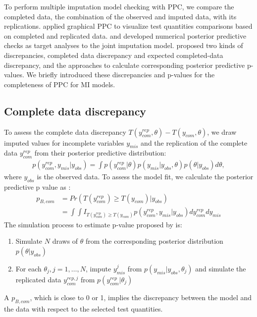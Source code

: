 	To perform multiple imputation model checking with PPC, we compare the completed data, the combination of the observed and imputed data, with its replications. \citet{gelman2005multiple} applied graphical PPC to visualize test quantities comparisons based on completed and replicated data. \citet{he2012diagnosing} and \citet{nguyen2015posterior} developed numerical posterior predictive checks as target analyses to the joint imputation model. \citet{he2012diagnosing} proposed two kinds of discrepancies, completed data discrepancy and expected completed-data discrepancy, and the approaches to calculate corresponding posterior predictive p-values. We briefly introduced these discrepancies and p-values for the completeness of PPC for MI models.
	
	\subsection{Complete data discrepancy}
	To assess the complete data discrepancy $T(y_{com}^{rep}, \theta) - T(y_{com}, \theta)$, we draw imputed values for incomplete variables $y_{mis}$ and the replication of the complete data $y_{com}^{rep}$ from their posterior predictive distribution:
	\begin{equation}
		\begin{array}{ll}
			p(y_{com}^{rep}, y_{mis}|y_{obs}) = \int p(y_{com}^{rep}|\theta)p(y_{mis}|y_{obs}, \theta)p(\theta|y_{obs})d\theta,
		\end{array} 
	\end{equation}
	where $y_{obs}$ is the observed data.
	To assess the model fit, we calculate the posterior predictive p value as :
	\begin{equation}
		\begin{array}{ll}
			p_{B, com} &= Pr(T(y_{com}^{rep}) \ge T(y_{com})|y_{obs})\\
			&= \int\int I_{T(y_{com}^{rep}) \ge T(y_{com})}p(y_{com}^{rep}, y_{mis}|y_{obs})dy_{com}^{rep}dy_{mis}
		\end{array} 
	\end{equation}
	The simulation process to estimate p-value proposed by \citet{he2012diagnosing} is:
	\begin{enumerate}
		\item Simulate $N$ draws of $\theta$ from the corresponding posterior distribution $p(\theta|y_{obs})$
		\item For each $\theta_{j}, j=1, \dots, N$, impute $y_{mis}^j$ from $p(y_{mis}|y_{obs}, \theta_{j})$ and simulate the replicated data $y_{com}^{rep, j}$ from $p(y_{com}^{rep}|\theta_{j})$
	\end{enumerate}
	A $p_{B, com}$, which is close to 0 or 1, implies the discrepancy between the model and the data with respect to the selected test quantities.  
